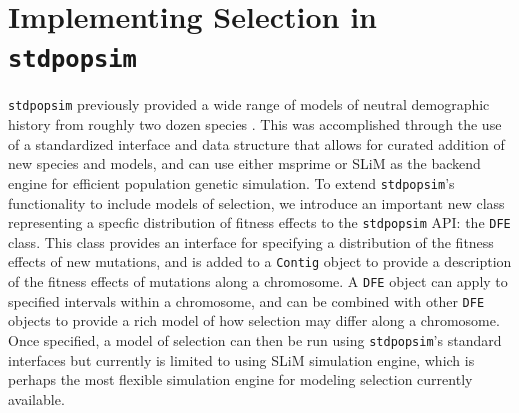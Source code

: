 \documentclass[hidelinks]{article}
\newcommand{\stdpopsim}{\texttt{stdpopsim}\xspace}
\begin{document}
\section*{Implementing Selection in \stdpopsim}
    \label{selection}

    \stdpopsim previously provided a wide range of models of neutral
    demographic history from roughly two dozen species \citep{lauterbur2023expanding}.
    This was accomplished through the use of a standardized interface
    and data structure that allows for curated addition of new
    species and models, and can use either
    msprime \citep{Baumdicker2022} or SLiM \citep{haller2019slim}
    as the backend engine for efficient population genetic simulation.
    To extend \stdpopsim's functionality to include models of selection, 
    we introduce an important new class representing a specfic distribution of fitness effects
    to the \stdpopsim API: the \texttt{DFE} class. 
    This class provides an interface for specifying
    a distribution of the fitness effects of new mutations, and
    is added to a \texttt{Contig} object to provide a description
    of the fitness effects of mutations along a chromosome.
    A \texttt{DFE} object can apply to specified intervals within a chromosome,
    and can be combined with other \texttt{DFE} objects to provide 
    a rich model of how selection may differ along a chromosome. 
    Once specified, a model of selection can then be run using \stdpopsim's standard interfaces
    but currently is limited to using SLiM simulation engine, which
    is perhaps the most flexible simulation engine for modeling selection currently available.
    
\end{document}
